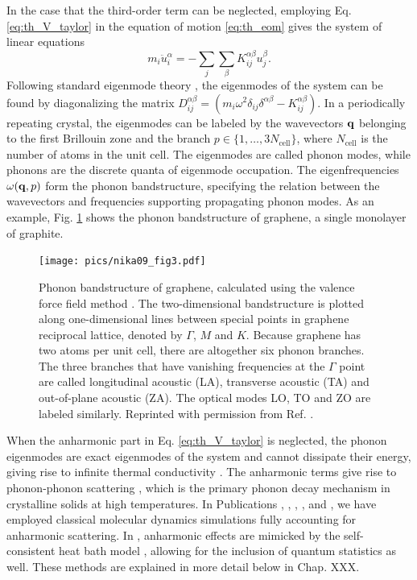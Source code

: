 In the case that the third-order term can be neglected, employing Eq. \eqref{eq:th_V_taylor} in the equation of motion \eqref{eq:th_eom} gives the system of linear equations
\begin{equation}
 m_i \ddot{u}_i^{\alpha} = - \sum_j \sum_{\beta} K_{ij}^{\alpha\beta} u_j^{\beta}.
\end{equation}
Following standard eigenmode theory \cite{fetter}, the eigenmodes of the system can be found by diagonalizing the matrix $D_{ij}^{\alpha\beta} = (m_i\omega^2 \delta_{ij}\delta
^{\alpha\beta}-K_{ij}^{\alpha\beta})$. In a periodically repeating crystal, the eigenmodes can be labeled by the wavevectors $\mathbf{q}$ belonging to the first Brillouin zone \cite{ziman} and the branch $p \in \{1,\dots,3N_{\textrm{cell}}\}$, where $N_{\textrm{cell}}$ is the number of atoms in the unit cell. The eigenmodes are called phonon modes, while phonons are the discrete quanta of eigenmode occupation. The eigenfrequencies $\omega(\mathbf{q},p)$ form the phonon bandstructure, specifying the relation between the wavevectors and frequencies supporting propagating phonon modes. As an example, Fig. \ref{fig:th_nika} shows the phonon bandstructure of graphene, a single monolayer of graphite.

\begin{figure}
\begin{center}
 \texttt{[image: pics/nika09\_fig3.pdf]}
 \caption{Phonon bandstructure of graphene, calculated using the valence force field method \cite{nika09}. The two-dimensional bandstructure is plotted along one-dimensional lines between special points in graphene reciprocal lattice, denoted by $\Gamma$, $M$ and $K$. Because graphene has two atoms per unit cell, there are altogether six phonon branches. The three branches that have vanishing frequencies at the $\Gamma$ point are called longitudinal acoustic (LA), transverse acoustic (TA) and out-of-plane acoustic (ZA). The optical modes LO, TO and ZO are labeled similarly. Reprinted with permission from Ref. \cite{nika09}.}
\label{fig:th_nika}
\end{center}
\end{figure} 

When the anharmonic part in Eq. \eqref{eq:th_V_taylor} is neglected, the phonon eigenmodes are exact eigenmodes of the system and cannot dissipate their energy, giving rise to infinite thermal conductivity \cite{ziman}. The anharmonic terms give rise to phonon-phonon scattering \cite{ziman}, which is the primary phonon decay mechanism in crystalline solids at high temperatures. In Publications , , , , and , we have employed classical molecular dynamics simulations fully accounting for anharmonic scattering. In , anharmonic effects are mimicked by the self-consistent heat bath model \cite{bolsterli70}, allowing for the inclusion of quantum statistics as well. These methods are explained in more detail below in Chap. XXX.

